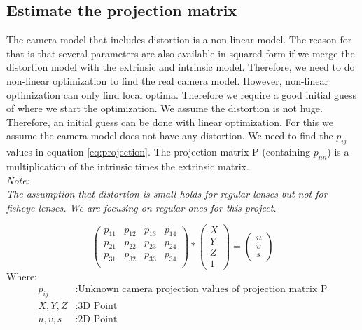 \documentclass[11pt,a4paper,titlepage,oneside]{report}
\begin{document}
\subsection{Estimate the projection matrix}\label{sec:est_proj}
The camera model that includes distortion is a non-linear model. The reason for that is that several parameters are also available in squared form if we merge the distortion model with the extrinsic and intrinsic model. Therefore, we need to do non-linear optimization to find the real camera model. However, non-linear optimization can only find local optima. Therefore we require a good initial guess of where we start the optimization. We assume the distortion is not huge. Therefore, an initial guess can be done with linear optimization. For this we assume the camera model does not have any distortion. We need to find the $p_{ij}$ values in equation \ref{eq:projection}. The projection matrix P (containing $p_{nn}$) is a multiplication of the intrinsic times the extrinsic matrix.\\
\em
Note:\\
The assumption that distortion is small holds for regular lenses but not for fisheye lenses. We are focusing on regular ones for this project.
\normalfont

\begin{equation}\label{eq:projection}
	\begin{pmatrix}p_{11} & p_{12} & p_{13} & p_{14}\\
		p_{21} & p_{22} & p_{23} & p_{24}\\
		p_{31} & p_{32} & p_{33} & p_{34}\\
	\end{pmatrix}*
	\begin{pmatrix}
		X \\
		Y \\
		Z \\
		1
	\end{pmatrix}=
	\begin{pmatrix}
		u \\
		v \\
		s
  \end{pmatrix}
\end{equation}
Where:
\begin{align*}
	p_{ij}		&: \text{Unknown camera projection values of projection matrix P}\\
	X,Y,Z			&: \text{3D Point}\\
	u,v,s			&: \text{2D Point}\\
\end{align*}
\end{document}
